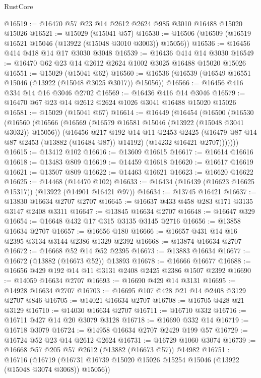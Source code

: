 \begin{lexlean}{RustCore}
\begin{coremodule}
@16519 := @16470 @57 @23 @14 @2612 @2624 @985 @3010 @16488 @15020 @15026
@16521 := @15029 (@15041 @57)
@16530 := @16506 (@16509 (@16519 @16521 @15046 (@13922 (@15048 @3010 @3003)) @15056))
@16536 := @16456 @414 @418 @14 @17 @3030 @3048
@16539 := @16436 @414 @14 @3030
@16549 := @16470 @62 @23 @14 @2612 @2624 @1002 @3025 @16488 @15020 @15026
@16551 := @15029 (@15041 @62)
@16560 := @16536 (@16539 (@16549 @16551 @15046 (@13922 (@15048 @3025 @3017)) @15056))
@16566 := @16456 @416 @334 @14 @16 @3046 @2702
@16569 := @16436 @416 @14 @3046
@16579 := @16470 @67 @23 @14 @2612 @2624 @1026 @3041 @16488 @15020 @15026
@16581 := @15029 (@15041 @67)
@16614 := @16449
    (@16454
      (@16500
        (@16530
          (@16560
            (@16566
              (@16569 (@16579 @16581 @15046 (@13922 (@15048 @3041 @3032)) @15056))
              (@16456
                @217
                @192
                @14
                @11
                @2453
                @2425
                (@16479 @87 @14 @87 @2453 (@13882 (@16484 @87)) @14192)
                (@14232 @16421 @2707)))))))
@16615 := @13412 @102
@16616 := @13609 @16615
@16617 := @16614 @16616
@16618 := @13483 @809
@16619 := @14459 @16618
@16620 := @16617 @16619
@16621 := @13507 @809
@16622 := @14463 @16621
@16623 := @16620 @16622
@16625 := @14468 (@14470 @102)
@16633 := @16434 (@16439 (@16623 @16625 @15317)) (@13922 (@14901 @16421 @97))
@16634 := @13745 @16421
@16637 := @13830 @16634 @2707 @2707
@16645 := @16637 @433 @458 @283 @171 @3135 @3147 @2408 @3311
@16647 := @13845 @16634 @2707
@16648 := @16647 @329
@16654 := @16648 @432 @17 @315 @3135 @3145 @2716
@16656 := @13858 @16634 @2707
@16657 := @16656 @180
@16666 := @16657 @431 @14 @16 @2395 @3134 @3144 @2386 @1329 @2392
@16668 := @13874 @16634 @2707
@16672 := @16668 @52 @14 @52 @2395
@16673 := @13883 @16634
@16677 := @16672 (@13882 (@16673 @52)) @13893
@16678 := @16666 @16677
@16688 := @16656 @429 @192 @14 @11 @3131 @2408 @2425 @2386 @1507 @2392
@16690 := @14059 @16634 @2707
@16693 := @16690 @429 @14 @3131
@16695 := @14928 @16634 @2707
@16703 := @16695 @107 @428 @21 @14 @2408 @3129 @2707 @846
@16705 := @14021 @16634 @2707
@16708 := @16705 @428 @21 @3129
@16710 := @14030 @16634 @2707
@16711 := @16710 @332
@16716 := @16711 @427 @14 @20 @3079 @3128
@16718 := @16690 @332 @14
@16719 := @16718 @3079
@16724 := @14958 @16634 @2707 @2429 @199 @57
@16729 := @16724 @52 @23 @14 @2612 @2624
@16731 := @16729 @1060 @3074
@16739 := @16668 @57 @205 @57 @2612 (@13882 (@16673 @57)) @14982
@16751 := @16716
    (@16719 (@16731 @16739 @15020 @15026 @15254 @15046 (@13922 (@15048 @3074 @3068)) @15056))

\end{coremodule}
\end{lexlean}
